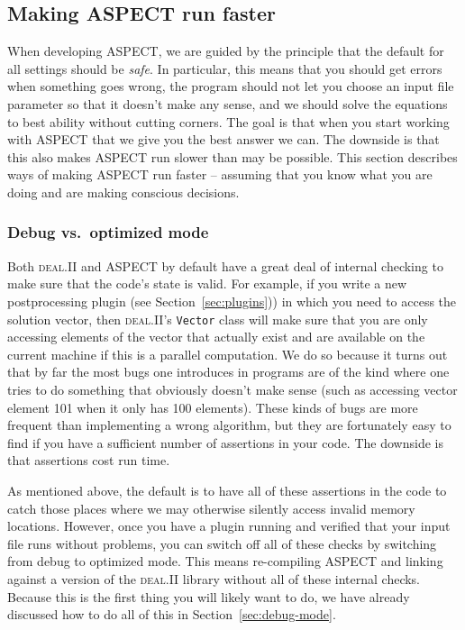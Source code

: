 \documentclass{article}
\newcommand{\dealii}{{\textsc{deal.II}}}
\newcommand{\aspect}{\textsc{ASPECT}}
\begin{document}
\subsection{Making \aspect{} run faster}

When developing \aspect{}, we are guided by the principle that the default for
all settings should be \textit{safe}. In particular, this means that you should
get errors when something goes wrong, the program should not let you choose an
input file parameter so that it doesn't make any sense, and we should solve the
equations to best ability without cutting corners. The goal is that when you
start working with \aspect{} that we give you the best answer we can. The
downside is that this also makes \aspect{} run slower than may be possible. This
section describes ways of making \aspect{} run faster -- assuming that you know
what you are doing and are making conscious decisions.

\subsubsection{Debug vs.~optimized mode}
Both \dealii{} and \aspect{} by default have a great deal of internal checking
to make sure that the code's state is valid. For example, if you write a new
postprocessing plugin (see Section~\ref{sec:plugins})) in which you need to
access the solution vector, then \dealii{}'s \texttt{Vector} class will make
sure that you are only accessing elements of the vector that actually exist and
are available on the current machine if this is a parallel computation. We do so
because it turns out that by far the most bugs one introduces in programs are of
the kind where one tries to do something that obviously doesn't make sense
(such as accessing vector element 101 when it only has 100 elements). These
kinds of bugs are more frequent than implementing a wrong algorithm, but they
are fortunately easy to find if you have a sufficient number of assertions in
your code. The downside is that assertions cost run time.

As mentioned above, the default is to have all of these assertions in the code
to catch those places where we may otherwise silently access invalid memory
locations. However, once you have a plugin running and verified that your input
file runs without problems, you can switch off all of these checks by switching
from debug to optimized mode. This means re-compiling \aspect{} and linking
against a version of the \dealii{} library without all of these internal checks.
Because this is the first thing you will likely want to do, we have already
discussed how to do all of this in Section~\ref{sec:debug-mode}.
\end{document}
